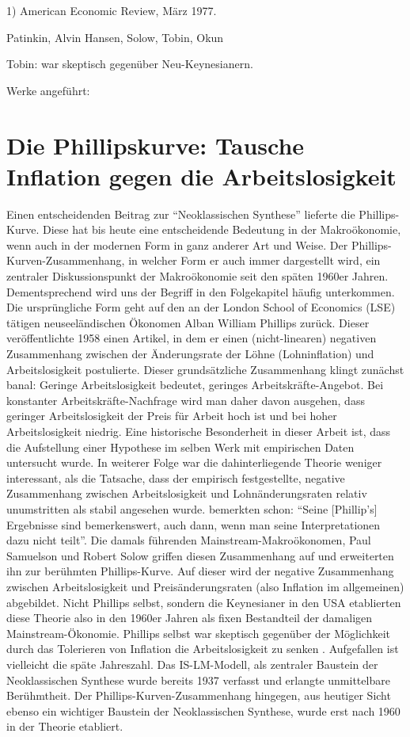 1) American Economic Review, März 1977.

Patinkin, Alvin Hansen, Solow, Tobin, Okun

Tobin: war skeptisch gegenüber Neu-Keynesianern. \textcite[S. 398]{Snowdon2005}

Werke angeführt: \parencite[S. 57]{Snowdon2005}


\section{Die Phillipskurve: Tausche Inflation gegen die Arbeitslosigkeit} \label{sec: Phillips}

Einen entscheidenden Beitrag zur "`Neoklassischen Synthese"' lieferte die Phillips-Kurve. Diese hat bis heute eine entscheidende Bedeutung in der Makroökonomie, wenn auch in der modernen Form in ganz anderer Art und Weise. Der Phillips-Kurven-Zusammenhang, in welcher Form er auch immer dargestellt wird, ein zentraler Diskussionspunkt der Makroökonomie seit den späten 1960er Jahren. Dementsprechend wird uns der Begriff in den Folgekapitel häufig unterkommen. Die ursprüngliche Form geht auf den an der London School of Economics (LSE) tätigen neuseeländischen Ökonomen Alban William Phillips zurück. Dieser veröffentlichte 1958 einen Artikel, in dem er einen (nicht-linearen) negativen Zusammenhang zwischen der Änderungsrate der Löhne (Lohninflation) und Arbeitslosigkeit postulierte. Dieser grundsätzliche Zusammenhang klingt zunächst banal: Geringe Arbeitslosigkeit bedeutet, geringes Arbeitskräfte-Angebot. Bei konstanter Arbeitskräfte-Nachfrage wird man daher davon ausgehen, dass geringer Arbeitslosigkeit der Preis für Arbeit hoch ist und bei hoher Arbeitslosigkeit niedrig. Eine historische Besonderheit in dieser Arbeit \parencite{Phillips1958} ist, dass die Aufstellung einer Hypothese im selben Werk mit empirischen Daten untersucht wurde. In weiterer Folge war die dahinterliegende Theorie weniger interessant, als die Tatsache, dass der empirisch festgestellte, negative Zusammenhang zwischen Arbeitslosigkeit und Lohnänderungsraten relativ unumstritten als stabil angesehen wurde. \textcite[S. 186]{Samuelson1960} bemerkten schon: "`Seine [Phillip's] Ergebnisse sind bemerkenswert, auch dann, wenn man seine Interpretationen dazu nicht teilt"'. Die damals führenden Mainstream-Makroökonomen, Paul Samuelson und Robert Solow griffen diesen Zusammenhang auf und erweiterten ihn zur berühmten Phillips-Kurve. Auf dieser wird der negative Zusammenhang zwischen Arbeitslosigkeit und Preisänderungsraten (also Inflation im allgemeinen) abgebildet. Nicht Phillips selbst, sondern die Keynesianer in den USA etablierten diese Theorie also in den 1960er Jahren als fixen Bestandteil der damaligen Mainstream-Ökonomie. Phillips selbst war skeptisch gegenüber der Möglichkeit durch das Tolerieren von Inflation die Arbeitslosigkeit zu senken \parencite[S. 142]{Snowdon2005}. Aufgefallen ist vielleicht die späte Jahreszahl. Das IS-LM-Modell, als zentraler Baustein der Neoklassischen Synthese wurde bereits 1937 verfasst und erlangte unmittelbare Berühmtheit. Der Phillips-Kurven-Zusammenhang hingegen, aus heutiger Sicht ebenso ein wichtiger Baustein der Neoklassischen Synthese, wurde erst nach 1960 in der Theorie etabliert.
